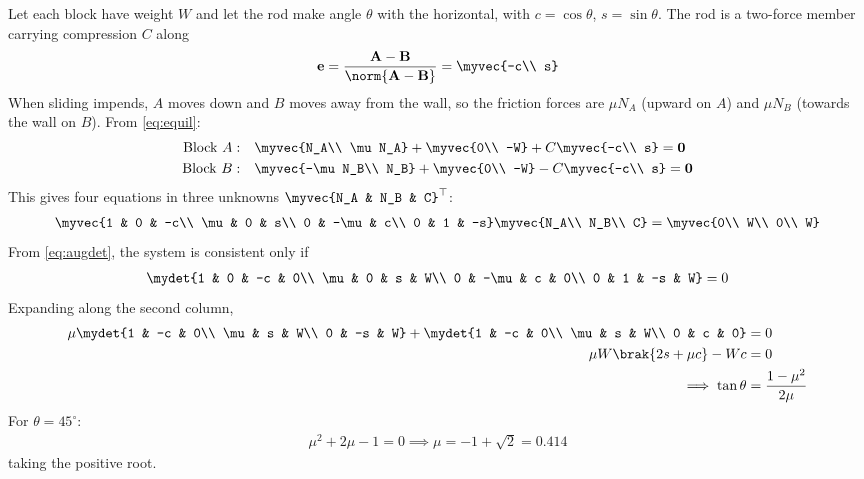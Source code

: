 \begin{enumerate}[label=1.2.\arabic*,leftmargin=*,labelsep=0.8em,itemsep=2ex]
\solution Let each block have weight $W$ and let the rod make angle $\theta$ with the horizontal, with $c = \cos\theta$, $s = \sin\theta$. The rod is a two-force member carrying compression $C$ along
\begin{align}
\mathbf{e} = \frac{\mathbf{A} - \mathbf{B}}{\norm{\mathbf{A} - \mathbf{B}}} = \myvec{-c\\ s}
\end{align}
When sliding impends, $A$ moves down and $B$ moves away from the wall, so the friction forces are $\mu N_A$ (upward on $A$) and $\mu N_B$ (towards the wall on $B$). From \eqref{eq:equil}:
\begin{align}
\text{Block }A:&\quad \myvec{N_A\\ \mu N_A} + \myvec{0\\ -W} + C\myvec{-c\\ s} = \mathbf{0}\\
\text{Block }B:&\quad \myvec{-\mu N_B\\ N_B} + \myvec{0\\ -W} - C\myvec{-c\\ s} = \mathbf{0}
\end{align}
This gives four equations in three unknowns $\myvec{N_A & N_B & C}^\top$:
\begin{align}
\myvec{1 & 0 & -c\\ \mu & 0 & s\\ 0 & -\mu & c\\ 0 & 1 & -s}\myvec{N_A\\ N_B\\ C} = \myvec{0\\ W\\ 0\\ W}
\end{align}
From \eqref{eq:augdet}, the system is consistent only if
\begin{align}
\mydet{1 & 0 & -c & 0\\ \mu & 0 & s & W\\ 0 & -\mu & c & 0\\ 0 & 1 & -s & W} = 0
\end{align}
Expanding along the second column,
\begin{align}
\mu\mydet{1 & -c & 0\\ \mu & s & W\\ 0 & -s & W} + \mydet{1 & -c & 0\\ \mu & s & W\\ 0 & c & 0} &= 0\\
\mu W\brak{2s + \mu c} - Wc &= 0\\
\implies \tan\theta &= \frac{1 - \mu^2}{2\mu}
\end{align}
For $\theta = 45^\circ$:
\begin{align}
\mu^2 + 2\mu - 1 = 0 \implies \mu = -1 + \sqrt{2} = 0.414
\end{align}
taking the positive root.


\end{enumerate}
